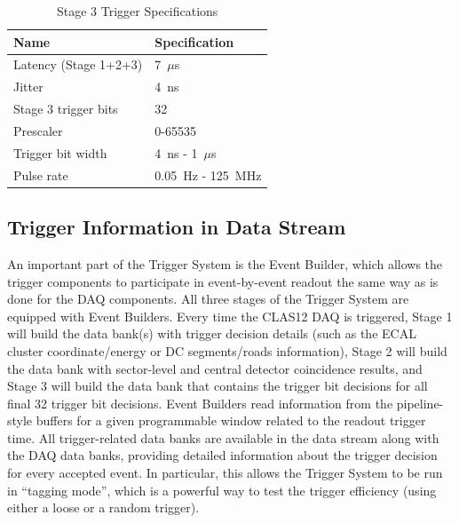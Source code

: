 \begin{table}
\begin{center}
	\begin{tabular}{| l | l |}
		\hline \hline
		Name				& Specification	\\
		\hline
		Latency (Stage 1+2+3)		& 7~$\mu$s	\\
		Jitter				& 4~ns		\\
		Stage 3 trigger bits		& 32		\\
		Prescaler			& 0-65535	\\
		Trigger bit width		& 4~ns - 1~$\mu$s	\\
		Pulse rate			& 0.05~Hz - 125~MHz	\\
		\hline \hline
	\end{tabular}
\end{center}
\caption{Stage 3 Trigger Specifications}
\label{tab:stage_3_specs}
\end{table}


\subsection{Trigger Information in Data Stream}
\label{sec:trigger_in_datastream}

An important part of the Trigger System is the Event Builder, which allows the trigger components to participate in event-by-event readout the same way as is done for the DAQ components. All three stages of the Trigger System are equipped with Event Builders. Every time the CLAS12 DAQ is triggered, Stage 1 will build the data bank(s) with trigger decision details (such as the ECAL cluster coordinate/energy or DC segments/roads information), Stage 2 will build the data bank with sector-level and central detector coincidence results, and Stage 3 will build the data bank that contains the trigger bit decisions for all final 32 trigger bit decisions. Event Builders read information from the pipeline-style buffers for a given programmable window related to the readout trigger time. All trigger-related data banks are available in the data stream along with the DAQ data banks, providing detailed information about the trigger decision for every accepted event. In particular, this allows the Trigger System to be run in ``tagging mode'', which is a powerful way to test the trigger efficiency (using either a loose or a random trigger).

